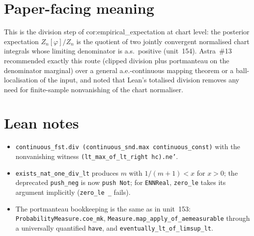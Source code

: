 \documentclass[11pt]{article}
\begin{document}
\section{Paper-facing meaning}
This is the division step of cor:empirical\_expectation at chart level: the posterior expectation
$Z_n[\varphi]/Z_n$ is the quotient of two jointly convergent normalised chart integrals whose limiting
denominator is a.s.\ positive (unit~154). Astra~\#13 recommended exactly this route (clipped division
plus portmanteau on the denominator marginal) over a general a.e.-continuous mapping theorem or a
ball-localisation of the input, and noted that Lean's totalised division removes any need for
finite-sample nonvanishing of the chart normaliser.

\section{Lean notes}
\begin{itemize}
\item \texttt{continuous\_fst.div (continuous\_snd.max continuous\_const)} with the nonvanishing
witness \texttt{(lt\_max\_of\_lt\_right hc).ne'}.
\item \texttt{exists\_nat\_one\_div\_lt} produces $m$ with $1/(m+1)<x$ for $x>0$; the deprecated
\texttt{push\_neg} is now \texttt{push Not}; for \texttt{ENNReal}, \texttt{zero\_le} takes its argument
implicitly (\texttt{zero\_le \_} fails).
\item The portmanteau bookkeeping is the same as in unit~153: \texttt{ProbabilityMeasure.coe\_mk},
\texttt{Measure.map\_apply\_of\_aemeasurable} through a universally quantified \texttt{have}, and
\texttt{eventually\_lt\_of\_limsup\_lt}.
\end{itemize}
\end{document}

